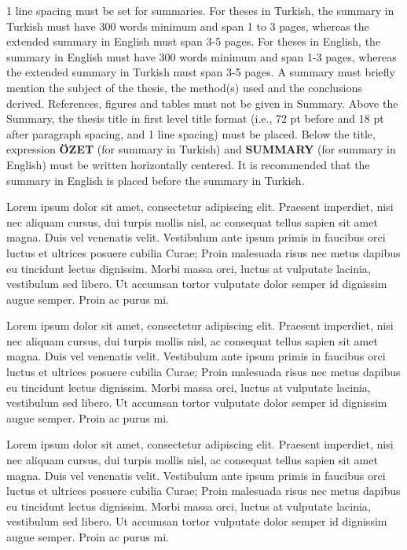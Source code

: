 1 line spacing must be set for summaries. For theses in Turkish, the summary in
Turkish must have 300 words minimum and span 1 to 3 pages, whereas the extended
summary in English must span 3-5 pages.
For theses in English, the summary in English must have 300 words minimum and
span 1-3 pages, whereas the extended summary in Turkish must span 3-5 pages.
A summary must briefly mention the subject of the thesis, the method(s) used and 
the conclusions derived.
References, figures and tables must not be given in Summary.
Above the Summary, the thesis title in first level title format 
(i.e., 72 pt before and 18 pt after paragraph spacing, and 1 line 
spacing) must be placed. Below the title, expression {\bf \"OZET} 
(for summary in Turkish) and {\bf SUMMARY} (for summary in English)
must be written horizontally centered.
It is recommended that the summary in English is placed before
the summary in Turkish.

Lorem ipsum dolor sit amet, consectetur adipiscing elit. Praesent imperdiet, nisi 
nec aliquam cursus, dui turpis mollis nisl, ac consequat tellus sapien sit amet 
magna. Duis vel venenatis velit. Vestibulum ante ipsum primis in faucibus orci 
luctus et ultrices posuere cubilia Curae; Proin malesuada risus nec metus dapibus 
eu tincidunt lectus dignissim. Morbi massa orci, luctus at vulputate lacinia, 
vestibulum sed libero. Ut accumsan tortor vulputate dolor semper id dignissim 
augue semper. Proin ac purus mi. 

Lorem ipsum dolor sit amet, consectetur adipiscing elit. Praesent imperdiet, nisi 
nec aliquam cursus, dui turpis mollis nisl, ac consequat tellus sapien sit amet 
magna. Duis vel venenatis velit. Vestibulum ante ipsum primis in faucibus orci 
luctus et ultrices posuere cubilia Curae; Proin malesuada risus nec metus dapibus 
eu tincidunt lectus dignissim. Morbi massa orci, luctus at vulputate lacinia, 
vestibulum sed libero. Ut accumsan tortor vulputate dolor semper id dignissim 
augue semper. Proin ac purus mi. 

Lorem ipsum dolor sit amet, consectetur adipiscing elit. Praesent imperdiet, nisi 
nec aliquam cursus, dui turpis mollis nisl, ac consequat tellus sapien sit amet 
magna. Duis vel venenatis velit. Vestibulum ante ipsum primis in faucibus orci 
luctus et ultrices posuere cubilia Curae; Proin malesuada risus nec metus dapibus 
eu tincidunt lectus dignissim. Morbi massa orci, luctus at vulputate lacinia, 
vestibulum sed libero. Ut accumsan tortor vulputate dolor semper id dignissim 
augue semper. Proin ac purus mi. 